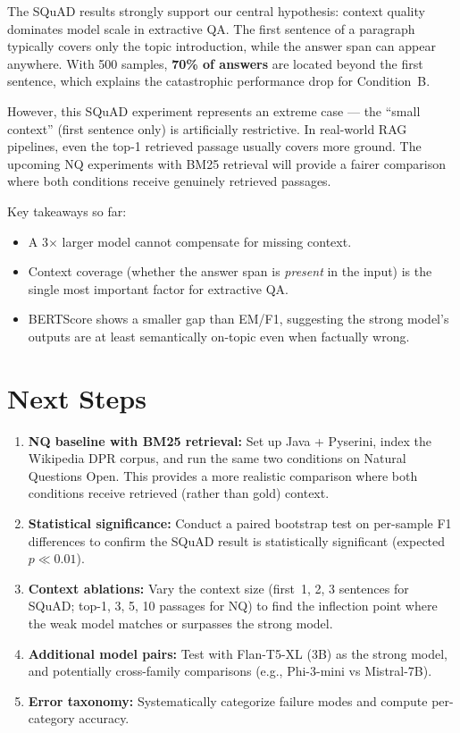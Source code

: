 \documentclass[11pt,a4paper]{article}
\begin{document}
The SQuAD results strongly support our central hypothesis: context quality dominates model scale in extractive QA. The first sentence of a paragraph typically covers only the topic introduction, while the answer span can appear anywhere. With 500 samples, \textbf{70\% of answers} are located beyond the first sentence, which explains the catastrophic performance drop for Condition~B.

However, this SQuAD experiment represents an extreme case --- the ``small context'' (first sentence only) is artificially restrictive. In real-world RAG pipelines, even the top-1 retrieved passage usually covers more ground. The upcoming NQ experiments with BM25 retrieval will provide a fairer comparison where both conditions receive genuinely retrieved passages.

Key takeaways so far:
\begin{itemize}
    \item A 3$\times$ larger model cannot compensate for missing context.
    \item Context coverage (whether the answer span is \textit{present} in the input) is the single most important factor for extractive QA.
    \item BERTScore shows a smaller gap than EM/F1, suggesting the strong model's outputs are at least semantically on-topic even when factually wrong.
\end{itemize}

\section{Next Steps}

\begin{enumerate}
    \item \textbf{NQ baseline with BM25 retrieval:} Set up Java + Pyserini, index the Wikipedia DPR corpus, and run the same two conditions on Natural Questions Open. This provides a more realistic comparison where both conditions receive retrieved (rather than gold) context.
    \item \textbf{Statistical significance:} Conduct a paired bootstrap test on per-sample F1 differences to confirm the SQuAD result is statistically significant (expected $p \ll 0.01$).
    \item \textbf{Context ablations:} Vary the context size (first~1, 2, 3 sentences for SQuAD; top-1, 3, 5, 10 passages for NQ) to find the inflection point where the weak model matches or surpasses the strong model.
    \item \textbf{Additional model pairs:} Test with Flan-T5-XL (3B) as the strong model, and potentially cross-family comparisons (e.g., Phi-3-mini vs Mistral-7B).
    \item \textbf{Error taxonomy:} Systematically categorize failure modes and compute per-category accuracy.
\end{enumerate}
\end{document}
